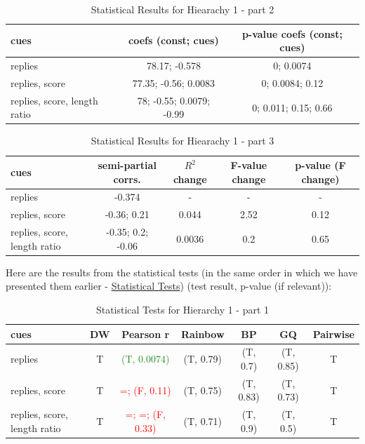 \documentclass[11pt, oneside]{article}   	%
\begin{document}
\begin{table}[H]
  \begin{center}
  \begin{tabular}{|l|c|c|}
    \hline
    cues & coefs (const; cues) & p-value coefs (const; cues) \\
    \hline
    replies & 78.17; -0.578 & 0; 0.0074 \\
    replies, score & 77.35; -0.56; 0.0083 & 0; 0.0084; 0.12 \\
    replies, score, length ratio & 78; -0.55; 0.0079; -0.99 & 0; 0.011; 0.15; 0.66 \\
    \hline
  \end{tabular}
  \caption{Statistical Results for Hiearachy 1 - part 2}
  \end{center}
\end{table}

\begin{table}[H]
  \begin{center}
  \begin{tabular}{|l|c|c|c|c|}
    \hline
    cues & semi-partial corrs. & $R^2$ change & F-value change & p-value (F change) \\
    \hline
    replies & -0.374 & - & - & - \\
    replies, score & -0.36; 0.21 & 0.044 & 2.52 & 0.12 \\
    replies, score, length ratio & -0.35; 0.2; -0.06 & 0.0036 & 0.2 & 0.65 \\
    \hline
  \end{tabular}
  \caption{Statistical Results for Hiearachy 1 - part 3}
  \end{center}
\end{table}

Here are the results from the statistical tests (in the same order in which we have presented them earlier - \href{list:stat_tests}{Statistical Tests}) (test result, p-value (if relevant)):
\begin{table}[H]
  \begin{center}
  \begin{tabular}{|l|c|c|c|c|c|c|}
    \hline
    cues & DW & Pearson r & Rainbow & BP & GQ & Pairwise \\
    \hline
    replies & T & \textcolor{ForestGreen}{(T, 0.0074)} & (T, 0.79) & (T, 0.7) & (T, 0.85) & T \\
    replies, score & T & \textcolor{red}{=; (F, 0.11)} & (T, 0.75) & (T, 0.83) & (T, 0.73) & T \\
    replies, score, length ratio & T & \textcolor{red}{=; =; (F, 0.33)} & (T, 0.71) & (T, 0.9) & (T, 0.5) & T \\
    \hline
  \end{tabular}
  \caption{Statistical Tests for Hierarchy 1 - part 1}
  \end{center}
\end{table}
\end{document}

